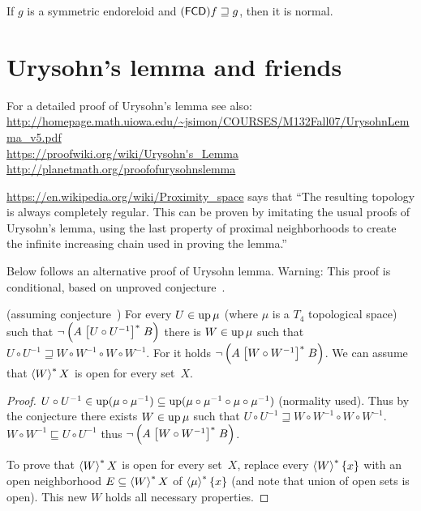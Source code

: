 \begin{cor}
If $g$ is a symmetric endoreloid and $(\mathsf{FCD}) f\sqsupseteq g$, then it is normal.
\end{cor}

\section{Urysohn's lemma and friends}

For a detailed proof of Urysohn's lemma see also:\\
\url{http://homepage.math.uiowa.edu/~jsimon/COURSES/M132Fall07/UrysohnLemma_v5.pdf}\\
\url{https://proofwiki.org/wiki/Urysohn's_Lemma}\\
\url{http://planetmath.org/proofofurysohnslemma}

\url{https://en.wikipedia.org/wiki/Proximity_space} says that
``The resulting topology is always completely regular. This can be proven by imitating the usual proofs of Urysohn's lemma, using the last property of proximal neighborhoods to create the infinite increasing chain used in proving the lemma.''

Below follows an alternative proof of Urysohn lemma. Warning: This proof is conditional,
based on unproved conjecture~.

\begin{lem}
  (assuming conjecture~) For every $U \in \operatorname{up} \mu$ (where $\mu$ is a $T_4$ topological space) such that
  $\neg \left( A \mathrel{\left[U \circ U^{- 1}\right]^{\ast}} B \right)$ there is $W \in
  \operatorname{up} \mu$ such that $U \circ U^{- 1} \sqsupseteq W \circ W^{- 1}
  \circ W \circ W^{- 1}$. For it holds $\neg \left( A \mathrel{\left[W \circ W^{-
  1}\right]^{\ast}} B \right)$.
  We can assume that $\left\langle W\right\rangle ^{\ast}X$ is open for every set~$X$.
\end{lem}

\begin{proof}
  $U \circ U^{- 1} \in \operatorname{up} (\mu \circ \mu^{- 1}) \subseteq
  \operatorname{up} (\mu \circ \mu^{- 1} \circ \mu \circ
  \mu^{- 1})$ (normality used). Thus by the conjecture there exists $W
  \in \operatorname{up} \mu$ such that $U \circ U^{- 1} \sqsupseteq W \circ W^{-
  1} \circ W \circ W^{- 1}$. $W \circ W^{- 1} \sqsubseteq U \circ U^{- 1}$
  thus $\neg \left( A \mathrel{\left[W \circ W^{- 1}\right]^{\ast}} B \right)$.
  
  To prove that $\left\langle W\right\rangle ^{\ast}X$ is open for every set~$X$, replace every $\left\langle W\right\rangle ^{\ast}\{x\}$
  with an open neighborhood $E\subseteq\left\langle W\right\rangle ^{\ast}X$ of $\left\langle \mu\right\rangle ^{\ast}\{x\}$
  (and note that union of open sets is open).
  This new $W$ holds all necessary properties.
\end{proof}

